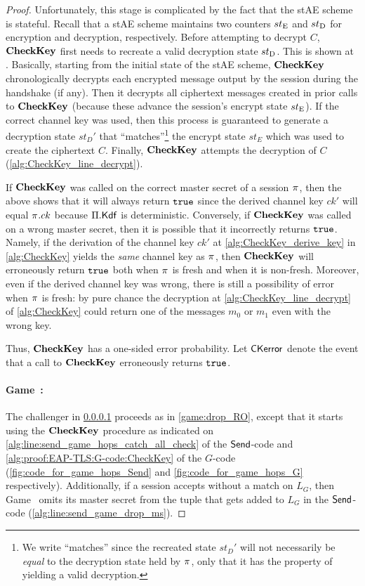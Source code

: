 \begin{proof}
Unfortunately,
this stage is complicated by the fact that the stAE scheme is stateful.
Recall that a stAE scheme maintains two counters $st_{\mathrm{E}}$ and  $st_{\mathrm{D}}$ for encryption and decryption,
respectively.
Before attempting to decrypt $C$,
$\mathbf{CheckKey}$ first needs to recreate a valid decryption state $st_{\mathrm{D}}$.
This is shown at .
Basically,
starting from the initial state of the stAE scheme,
$\mathbf{CheckKey}$ chronologically decrypts each encrypted message output by the session during the handshake (if any).
Then it decrypts all ciphertext messages created in prior calls to $\mathbf{CheckKey}$  
(because these advance the session's encrypt state $st_{\mathrm{E}}$).
If the correct channel key was used,
then this process is guaranteed to generate a decryption state $st_D'$ that ``matches''\footnote{We write ``matches'' since the recreated state $st_D'$ will not necessarily be \emph{equal} to the decryption state held by $\oracle$, only that it has the property of yielding a valid decryption.}
the encrypt state $st_E$ which was used to create the ciphertext $C$. 
Finally, $\mathbf{CheckKey}$ attempts the decryption of $C$ (\cref{alg:CheckKey_line_decrypt}).   


If $\mathbf{CheckKey}$ was called on the correct master secret of a session $\oracle$,
then the above shows that it will always return $\mathtt{true}$ since the derived channel key $ck'$ will equal $\oracle.ck$ because  $\mathrm{\Pi}.\mathsf{Kdf}$ is deterministic.
Conversely,
if $\mathbf{CheckKey}$ was called on a wrong master secret, then it is possible that it incorrectly returns $\mathtt{true}$.
Namely,
if the derivation of the channel key $ck'$ at \cref{alg:CheckKey_derive_key} in \cref{alg:CheckKey} yields the \emph{same} channel key as $\oracle$,
then $\mathbf{CheckKey}$ will erroneously return $\mathtt{true}$ both when $\oracle$ is fresh and when it is non-fresh.
Moreover,
even if the derived channel key was wrong,
there is still a possibility of error when $\oracle$ is fresh:
by pure chance the decryption at \cref{alg:CheckKey_line_decrypt} of \cref{alg:CheckKey} could return one of the messages $m_0$ or $m_1$ even with the wrong key.

Thus,
$\mathbf{CheckKey}$ has a one-sided error probability.
Let $\mathsf{CKerror}$ denote the event that a call to $\mathbf{CheckKey}$ erroneously returns $\mathtt{true}$.


\newgame
\paragraph{Game~\game:} \label{game:remove_code_send} 
The challenger in \cref{game:remove_code_send} proceeds as in \cref{game:drop_RO},
except that it starts using the $\mathbf{CheckKey}$ procedure as indicated on \cref{alg:line:send_game_hops_catch_all_check} of the $\mathsf{Send}$-code and \cref{alg:proof:EAP-TLS:G-code:CheckKey} of the $G$-code
(\cref{fig:code_for_game_hops_Send} and \cref{fig:code_for_game_hops_G} respectively).
Additionally,
if a session accepts without a match on $L_G$,
then Game~\game{} omits its master secret from the tuple that gets added to $L_G$ in the $\mathsf{Send}$-code (\cref{alg:line:send_game_drop_ms}).


\end{proof}

